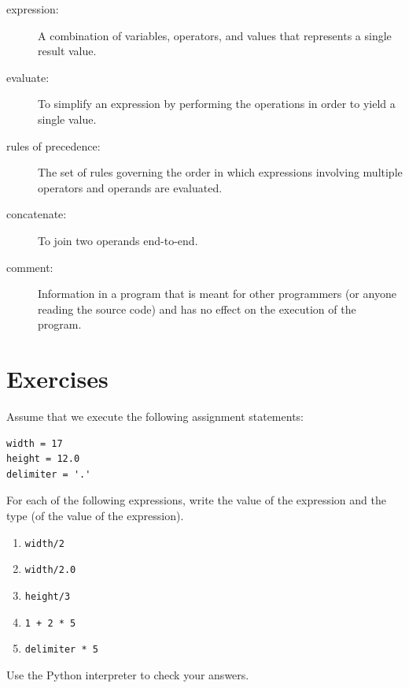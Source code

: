 \documentclass[10pt]{book}
\begin{document}
\begin{description}
\item[expression:]  A combination of variables, operators, and values that
represents a single result value.

\item[evaluate:]  To simplify an expression by performing the operations
in order to yield a single value.

\item[rules of precedence:]  The set of rules governing the order in which
expressions involving multiple operators and operands are evaluated.

\item[concatenate:]  To join two operands end-to-end.

\item[comment:]  Information in a program that is meant for other
programmers (or anyone reading the source code) and has no effect on the
execution of the program.

\end{description}


\section{Exercises}

\begin{exercise}

Assume that we execute the following assignment statements:

\begin{verbatim}
width = 17
height = 12.0
delimiter = '.'
\end{verbatim}

For each of the following expressions, write the value of the
expression and the type (of the value of the expression).

\begin{enumerate}

\item {\tt width/2}

\item {\tt width/2.0}

\item {\tt height/3}

\item {\tt 1 + 2 * 5}

\item {\tt delimiter * 5}

\end{enumerate}

Use the Python interpreter to check your answers.
\end{exercise}
\end{document}
